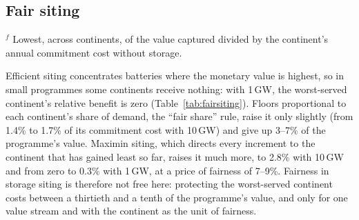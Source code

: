 \subsection{Fair siting}

\begin{table}[t]
\centering
\caption{Efficient and fair siting of storage programmes under soft GDMA operations: annual value, the relative benefit of the worst-served continent, and the price of fairness (PoF, the share of the efficient programme's value given up). Value and relative benefit: higher is better; price of fairness: lower is better.}\label{tab:fairsiting}
\footnotesize
\setlength{\tabcolsep}{4pt}

\par\smallskip\footnotesize $^f$ Lowest, across continents, of the value captured divided by the continent's annual commitment cost without storage.
\end{table}

Efficient siting concentrates batteries where the monetary value is highest, so in small programmes some continents receive nothing: with 1\,GW, the worst-served continent's relative benefit is zero (Table~\ref{tab:fairsiting}).
Floors proportional to each continent's share of demand, the ``fair share'' rule, raise it only slightly (from 1.4\% to 1.7\% of its commitment cost with 10\,GW) and give up 3--7\% of the programme's value.
Maximin siting, which directs every increment to the continent that has gained least so far, raises it much more, to 2.8\% with 10\,GW and from zero to 0.3\% with 1\,GW, at a price of fairness of 7--9\%.
Fairness in storage siting is therefore not free here: protecting the worst-served continent costs between a thirtieth and a tenth of the programme's value, and only for one value stream and with the continent as the unit of fairness.
